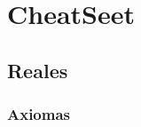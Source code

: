 \documentclass[12pt, fleqn]{report}                             %
\theoremstyle{break}                                            %
\begin{document}
\part{CheatSeet}

    \clearpage
    \chapter{Reales}


        \section{Axiomas}
\end{document}
